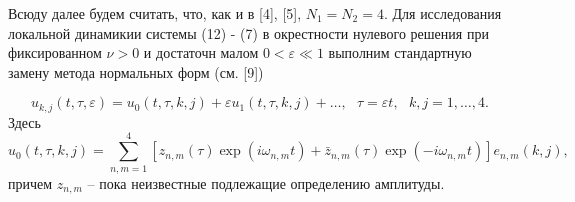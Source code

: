 \documentclass[12pt]{article}  %
\begin{document}
         

Всюду далее будем считать, что, как и в [4], [5], $N_1 = N_2 = 4$. 
Для исследования локальной динамикии системы (12) \-- (7) в окрестности нулевого решения при фиксированном $\nu > 0$ и достаточн малом $0 < \varepsilon \ll 1$ выполним стандартную замену метода нормальных форм (см. [9])

\begin{equation}
u_{k,j}(t,\tau,\varepsilon) = u_0(t,\tau,k,j) + \varepsilon u_1(t,\tau,k,j) + \dots,\ \ \ \tau = \varepsilon t, \ \ \ k,j = 1,\dots,4.
\end{equation}
Здесь
\begin{equation}
u_0(t,\tau,k,j) = \sum_{n,m=1}^{4}\left[z_{n,m}(\tau)\exp(i\omega_{n,m}t)+\bar{z}_{n,m}(\tau)\exp(-i\omega_{n,m}t)\right]e_{n,m}(k,j),
\end{equation}
причем $z_{n,m}$ \--- пока неизвестные подлежащие определению амплитуды.
 
\end{document}
